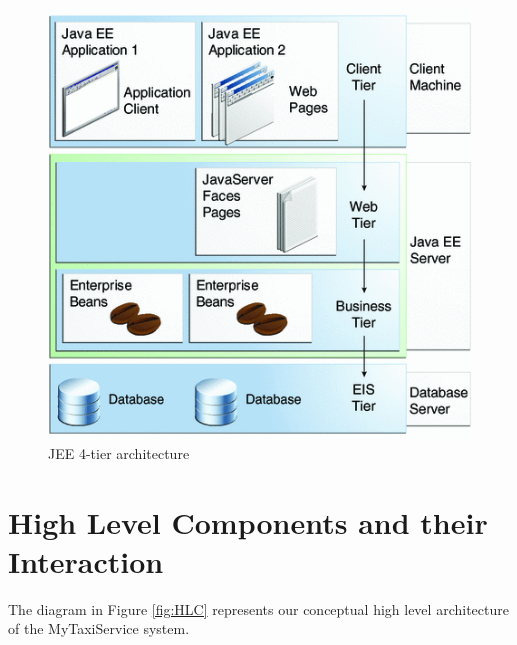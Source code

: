 \begin{figure}[htbp]
\centering
\includegraphics[width=\textwidth]{cpt/img/JavaEEOverview}
\caption{JEE 4-tier architecture}
\end{figure}
\clearpage

\section{High Level Components and their Interaction}
The diagram in Figure \ref{fig:HLC}  represents our conceptual high level architecture of the MyTaxiService system.

